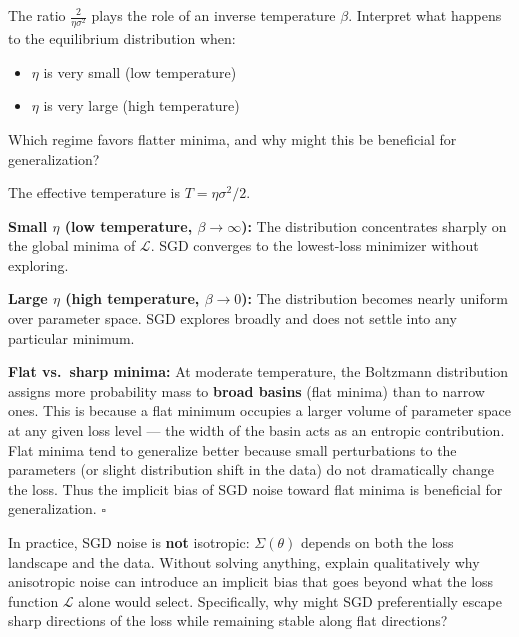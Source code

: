 \documentclass[11pt]{article}
\providecommand{\tightlist}{%
  \setlength{\itemsep}{0pt}\setlength{\parskip}{0pt}}
\begin{document}
\begin{exercise}
\label{ex:td-6b}
The ratio \(\frac{2}{\eta \sigma^2}\) plays the role of an
inverse temperature \(\beta\). Interpret what happens to the equilibrium
distribution when:

\begin{itemize}
\tightlist
\item
  \(\eta\) is very small (low temperature)
\item
  \(\eta\) is very large (high temperature)
\end{itemize}

Which regime favors flatter minima, and why might this be beneficial for
generalization?
\end{exercise}

\begin{solution}[ex:td-6b]
The effective temperature is \(T = \eta\sigma^2/2\).

\textbf{Small \(\eta\) (low temperature, \(\beta \to \infty\)):} The
distribution concentrates sharply on the global minima of
\(\mathcal{L}\). SGD converges to the lowest-loss minimizer without
exploring.

\textbf{Large \(\eta\) (high temperature, \(\beta \to 0\)):} The
distribution becomes nearly uniform over parameter space. SGD explores
broadly and does not settle into any particular minimum.

\textbf{Flat vs.~sharp minima:} At moderate temperature, the Boltzmann
distribution assigns more probability mass to \textbf{broad basins}
(flat minima) than to narrow ones. This is because a flat minimum
occupies a larger volume of parameter space at any given loss level ---
the width of the basin acts as an entropic contribution. Flat minima
tend to generalize better because small perturbations to the parameters
(or slight distribution shift in the data) do not dramatically change
the loss. Thus the implicit bias of SGD noise toward flat minima is
beneficial for generalization. \(\square\)
\end{solution}

\begin{exercise}
\label{ex:td-6c}
In practice, SGD noise is \textbf{not} isotropic:
\(\Sigma(\theta)\) depends on both the loss landscape and the data.
Without solving anything, explain qualitatively why anisotropic noise
can introduce an implicit bias that goes beyond what the loss function
\(\mathcal{L}\) alone would select. Specifically, why might SGD
preferentially escape sharp directions of the loss while remaining
stable along flat directions?
\end{exercise}
\end{document}
